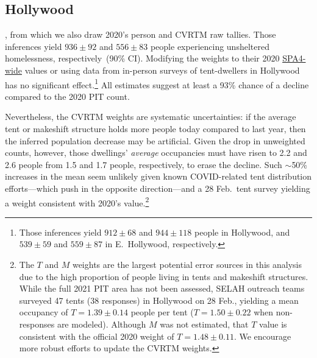 \documentclass[11pt,twocolumn]{article}
\def\resp{respectively}
\begin{document}

\subsection{Hollywood}
\label{sec:hWood}

, from which we also draw 2020's person and CVRTM raw tallies. Those inferences yield 
$936\pm92$ and $556\pm83$ people experiencing unsheltered homelessness, \resp\ (90\% CI). Modifying the weights
to their 2020 \href{https://www.lahsa.org/documents?id=4693-2020-greater-los-angeles-homeless-count-cvrtm-conversion-factors}
{SPA4-wide} values or using data from in-person surveys of tent-dwellers in Hollywood has no
significant effect.\footnote{Those inferences yield $912\pm68$ and $944\pm118$ people
in Hollywood, and $539\pm59$ and $559\pm87$ in E.~Hollywood, \resp.} 
All estimates suggest at least a 93\% chance of a decline compared to the 2020 PIT count.

Nevertheless, the CVRTM weights are systematic uncertainties: if the average tent or makeshift structure holds
more people today compared to last year, then the inferred population decrease may be artificial. Given the drop in 
unweighted counts, however, those dwellings' {\it average} occupancies must have risen to 2.2 and 2.6 people 
from 1.5 and 1.7 people, \resp, to erase the decline. Such $\sim$50\% increases in the mean seem unlikely given 
known COVID-related tent distribution efforts---which push in the opposite direction---and a 28 Feb.\ tent 
survey yielding a weight consistent with 2020's value.\footnote{The $T$ and $M$ weights are the largest 
potential error sources in this analysis due to the high proportion of people living in tents and makeshift structures. 
While the full 2021 PIT area has not been assessed, SELAH outreach teams surveyed 47 tents (38 responses) in 
Hollywood on 28 Feb., yielding a mean occupancy of $T=1.39\pm0.14$ people per tent ($T=1.50\pm0.22$ when 
non-responses are modeled). Although $M$ was not estimated, that $T$ value is consistent with the official 2020 
weight of $T=1.48\pm0.11$. We encourage more robust efforts to update the CVRTM weights.} 
\end{document}
